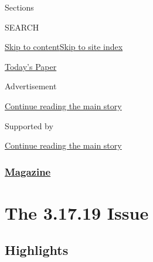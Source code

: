 Sections

SEARCH

\protect\hyperlink{site-content}{Skip to
content}\protect\hyperlink{site-index}{Skip to site index}

\href{https://myaccount.nytimes3xbfgragh.onion/auth/login?response_type=cookie\&client_id=vi}{}

\href{https://www.nytimes3xbfgragh.onion/section/todayspaper}{Today's
Paper}

Advertisement

\protect\hyperlink{after-top}{Continue reading the main story}

Supported by

\protect\hyperlink{after-sponsor}{Continue reading the main story}

\hypertarget{magazine}{%
\subsubsection{\texorpdfstring{\href{/section/magazine}{Magazine}}{Magazine}}\label{magazine}}

\hypertarget{the-31719-issue}{%
\section{The 3.17.19 Issue}\label{the-31719-issue}}

\hypertarget{highlights}{%
\subsection{Highlights}\label{highlights}}

